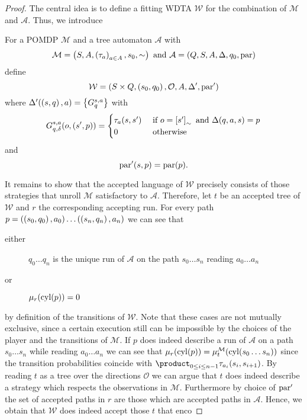 \begin{proof}
  The central idea is to define a fitting \ac{WDTA} $\mathcal{W}$ for the
  combination of $\mathcal{M}$ and $\mathcal{A}$. Thus, we introduce
  \begin{definition}
    For a \ac{POMDP} $\mathcal{M}$ and a tree automaton $\mathcal{A}$ with
    \begin{equation*}
      \mathcal{M} = \left(S,A,\left(\tau_{a}\right)_{a\in A},s_{0},\sim\right)
      \text{ and }
      \mathcal{A} = \left(Q,S,A,\Delta,q_{0},\operatorname{par}\right)
    \end{equation*}
    define
    \begin{equation*}
      \mathcal{W} = \left(S\times Q, \left(s_{0}, q_{0}\right), \mathcal{O}, A,
      \Delta', \operatorname{par}'\right)
    \end{equation*}
    where $\Delta'(\left(s,q\right), a) = \left\{G^{s,a}_{q}\right\}$ with
    \begin{equation*}
      G^{s,a}_{q,\delta}(o, \left(s', p\right)) = \begin{cases}
        \tau_{a}(s, s')&\text{ if }o = \left[s'\right]_{\sim}\text{ and }
        \Delta(q,a,s) = p\\
        0&\text{ otherwise}
      \end{cases}
    \end{equation*}
    and
    \begin{equation*}
      \operatorname{par}'(s,p) = \operatorname{par}(p).
    \end{equation*}
  \end{definition}
  It remains to show that the accepted language of $\mathcal{W}$ precisely
  consists of those strategies that unroll $\mathcal{M}$ satisfactory to
  $\mathcal{A}$. Therefore, let $t$ be an accepted tree of $\mathcal{W}$ and
  $r$ the corresponding accepting run. For every path
  $p = \left(\left(s_{0},q_{0}\right), a_{0}\right)\dots\left(\left(s_{n},q_{n}\right), a_{n}\right)$
  we can see that
  \begin{description}
    \item[either] $q_{0}\dots q_{n}$ is the unique run of $\mathcal{A}$ on the
      path $s_{0}\dots s_{n}$ reading $a_{0}\dots a_{n}$
    \item[or] $\mu_{r}(\operatorname{cyl}(p)) = 0$
  \end{description}
  by definition of the transitions of $\mathcal{W}$. Note that these cases are
  not mutually exclusive, since a certain execution still can be impossible by
  the choices of the player and the transitions of $\mathcal{M}$. If $p$ does
  indeed describe a run of $\mathcal{A}$ on a path $s_{0}\dots s_{n}$ while
  reading $a_{0}\dots a_{n}$ we can see that
  $\mu_{r}(\operatorname{cyl}(p)) = \mu_{t}^{\mathcal{M}}(\operatorname{cyl}(s_{0}\dots s_{n}))$ since the
  transition probabilities coincide with
  $\product_{0\leq i\leq n-1}\tau_{a_{i}}(s_{i}, s_{i+1})$. By reading $t$ as a
  tree over the directions $\mathcal{O}$ we can argue that $t$ does indeed
  describe a strategy which respects the observations in $\mathcal{M}$.
  Furthermore by choice of $\operatorname{par}'$ the set of accepted paths in $r$ are
  those which are accepted paths in $\mathcal{A}$. Hence, we obtain that
  $\mathcal{W}$ does indeed accept those $t$ that enco
\end{proof}

